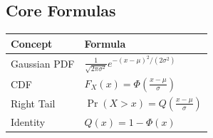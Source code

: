 \documentclass[11pt]{article}
\begin{document}
\subsection*{Core Formulas}
\begin{table}[h!]
    \centering
    \renewcommand{\arraystretch}{2.0} %
    \begin{tabular}{|l|l|}
        \hline
        \textbf{Concept} & \textbf{Formula} \\ \hline
        Gaussian PDF & $\displaystyle \frac{1}{\sqrt{2\pi\sigma^2}} e^{-(x-\mu)^2/(2\sigma^2)}$ \\ \hline
        CDF & $\displaystyle F_X(x) = \Phi\left( \frac{x-\mu}{\sigma} \right)$ \\ \hline
        Right Tail & $\displaystyle \Pr(X > x) = Q\left( \frac{x-\mu}{\sigma} \right)$ \\ \hline
        Identity & $Q(x) = 1 - \Phi(x)$ \\ \hline
    \end{tabular}
\end{table}
\end{document}
